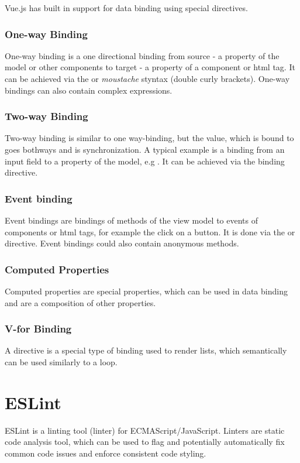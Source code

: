 Vue.js has built in support for data binding using special directives.

\subsubsection{One-way Binding}
One-way binding is a one directional binding from source - a property of the model or other components to target - a property of a component or html tag. It can be achieved via the  or \textit{moustache} styntax (double curly brackets). One-way bindings can also contain complex expressions.

\subsubsection{Two-way Binding}
Two-way binding is similar to one way-binding, but the value, which is bound to goes bothways and is synchronization. A typical example is a binding from an input field to a property of the model, e.g . It can be achieved via the  binding directive.

\subsubsection{Event binding}
Event bindings are bindings of methods of the view model to events of components or html tags, for example the click on a button. It is done via the  or  directive. Event bindings could also contain anonymous methods.

\subsubsection{Computed Properties}
Computed properties are special properties, which can be used in data binding and are a composition of other properties. 

\subsubsection{V-for Binding}
A  directive is a special type of binding used to render lists, which semantically can be used similarly to a  loop.

\section{ESLint}

ESLint \parencite{eslintMainPage} is a linting tool (linter) for ECMAScript/JavaScript. Linters are static code analysis tool, which can be used to flag and potentially automatically fix common code issues and enforce consistent code styling.

